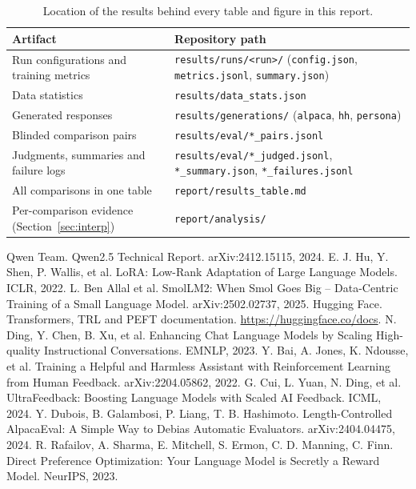 \documentclass[10pt,a4paper]{article}
\newcommand{\code}[1]{\texttt{#1}}
\begin{document}
\begin{table}[!htb]
\centering\small
\caption{Location of the results behind every table and figure in this report.}
\label{tab:paths}
\begin{tabularx}{\textwidth}{@{}p{5.2cm}Y@{}}
\toprule
Artifact & Repository path \\
\midrule
Run configurations and training metrics & \nolinkurl{results/runs/<run>/} (\code{config.json}, \code{metrics.jsonl}, \code{summary.json}) \\
Data statistics & \nolinkurl{results/data_stats.json} \\
Generated responses & \nolinkurl{results/generations/} (\code{alpaca}, \code{hh}, \code{persona}) \\
Blinded comparison pairs & \nolinkurl{results/eval/*_pairs.jsonl} \\
Judgments, summaries and failure logs & \nolinkurl{results/eval/*_judged.jsonl}, \nolinkurl{*_summary.json}, \nolinkurl{*_failures.jsonl} \\
All comparisons in one table & \nolinkurl{report/results_table.md} \\
Per-comparison evidence (Section~\ref{sec:interp}) & \nolinkurl{report/analysis/} \\
\bottomrule
\end{tabularx}
\end{table}

{\small
\begin{thebibliography}{9}
\setlength{\itemsep}{1pt}
 Qwen Team. Qwen2.5 Technical Report. arXiv:2412.15115, 2024.
 E. J. Hu, Y. Shen, P. Wallis, et al. LoRA: Low-Rank Adaptation of Large Language Models. ICLR, 2022.
 L. Ben Allal et al. SmolLM2: When Smol Goes Big -- Data-Centric Training of a Small Language Model. arXiv:2502.02737, 2025.
 Hugging Face. Transformers, TRL and PEFT documentation. \url{https://huggingface.co/docs}.
 N. Ding, Y. Chen, B. Xu, et al. Enhancing Chat Language Models by Scaling High-quality Instructional Conversations. EMNLP, 2023.
 Y. Bai, A. Jones, K. Ndousse, et al. Training a Helpful and Harmless Assistant with Reinforcement Learning from Human Feedback. arXiv:2204.05862, 2022.
 G. Cui, L. Yuan, N. Ding, et al. UltraFeedback: Boosting Language Models with Scaled AI Feedback. ICML, 2024.
 Y. Dubois, B. Galambosi, P. Liang, T. B. Hashimoto. Length-Controlled AlpacaEval: A Simple Way to Debias Automatic Evaluators. arXiv:2404.04475, 2024.
 R. Rafailov, A. Sharma, E. Mitchell, S. Ermon, C. D. Manning, C. Finn. Direct Preference Optimization: Your Language Model is Secretly a Reward Model. NeurIPS, 2023.
\end{thebibliography}
}
\end{document}

